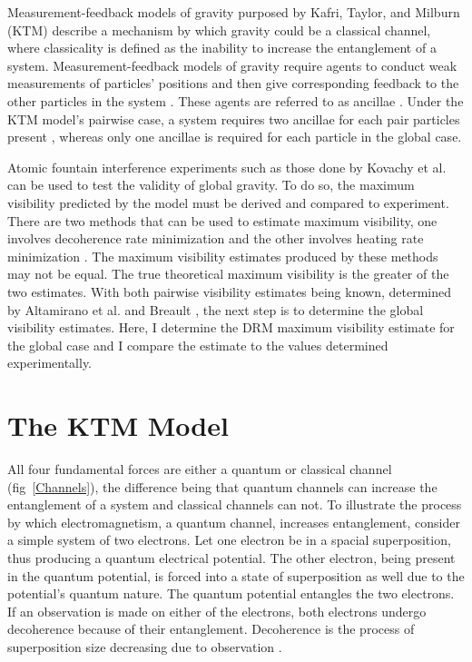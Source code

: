 \documentclass[aps, prd, superscriptaddress,twocolumn,amsmath,amssymb,nofootinbib]{revtex4-1}
\begin{document}
Measurement-feedback models of gravity purposed by Kafri, Taylor, and Milburn (KTM) \cite{KTM1, KTM2, KTM3} describe a mechanism by which gravity could be a classical channel, where classicality is defined as the inability to increase the entanglement of a system. Measurement-feedback models of gravity require agents to conduct weak measurements of particles' positions and then give corresponding feedback to the other particles in the system \cite{P6}. These agents are referred to as ancillae \cite{P2}. Under the KTM model's pairwise case, a system requires two ancillae for each pair particles present \cite{P3}, whereas only one ancillae is required for each particle in the global case.

Atomic fountain interference experiments such as those done by Kovachy et al. \cite{kovachy} can be used to test the validity of global gravity. To do so, the maximum visibility predicted by the model must be derived and compared to experiment. There are two methods that can be used to estimate maximum visibility, one involves decoherence rate minimization and the other involves heating rate minimization \cite{P3}. The maximum visibility estimates produced by these methods may not be equal. The true theoretical maximum visibility is the greater of the two estimates. With both pairwise visibility estimates being known, determined by Altamirano et al. and Breault \cite{P3, breault}, the next step is to determine the global visibility estimates. Here, I determine the DRM maximum visibility estimate for the global case and I compare the estimate to the values determined experimentally.


\section{The KTM Model}

All four fundamental forces are either a quantum or classical channel (fig~\ref{Channels}), the difference being that quantum channels can increase the entanglement of a system and classical channels can not. To illustrate the process by which electromagnetism, a quantum channel, increases entanglement, consider a simple system of two electrons. Let one electron be in a spacial superposition, thus producing a quantum electrical potential. The other electron, being present in the quantum potential, is forced into a state of superposition as well due to the potential's quantum nature. The quantum potential entangles the two electrons. If an observation is made on either of the electrons, both electrons undergo decoherence because of their entanglement. Decoherence is the process of superposition size decreasing due to observation \cite{P6}.
\end{document}

